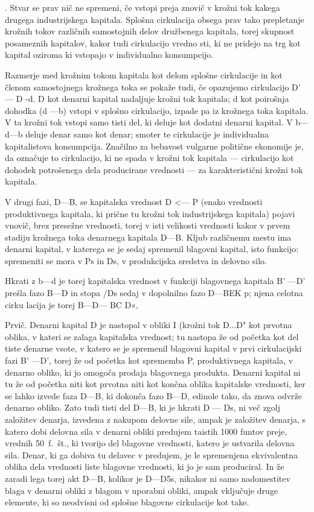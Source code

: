 \documentclass[kapital_02.tex]{subfiles}
\begin{document}
. Stvar se prav nič ne spremeni, če vstopi preja znovič v krožni tok kakega drugega industrijskega kapitala. Splošna cirkulacija obsega prav tako prepletanje krožnih tokov različnih samostojnih delov družbenega kapitala, torej skupnost posameznih kapitalov, kakor tudi cirkulacijo vredno sti, ki ne pridejo na trg kot kapital oziroma ki vstopajo v individualno konsumpcijo.

Razmerje med krožnim tokom kapitala kot delom splošne cirkulacije in kot členom samostojnega krožnega toka se pokaže tudi, če opazujemo cirkulacijo D' — D -d. D kot denarni kapital nadaljuje krožni tok kapitala; d kot poirošnja dohodka (d —b) vstopi v splošno cirkulacijo, izpade pa iz krožnega toka kapitala. V ta krožni tok vstopi samo tisti del, ki deluje kot dodatni denarni kapital. V b—d—b deluje denar samo kot denar; smoter te cirkulacije je individualna kapitalistova konsumpcija. Značilno za bebavost vulgarne politične ekonomije je, da označuje to cirkulacijo, ki ne spada v krožni tok kapitala — cirkulacijo kot dohodek potrošenega dela producirane vrednosti — za karakteristični krožni tok kapitala.

V drugi fazi, D—B, se kapitalska vrednost D <— P (enako vrednosti produktivnega kapitala, ki prične tu krožni tok industrijskega kapitala) pojavi vnovič, brez presežne vrednosti, torej v isti velikosti vrednosti kakor v prvem stadiju krožnega toka denarnega kapitala D—B. Kljub različnemu mestu ima denarni kapital, v katerega se je sedaj spremenil blagovni kapital, isto funkcijo: spremeniti se mora v Ps in Ds, v produkcijska sredstva in delovno silo.

Hkrati z b—d je torej kapitalska vrednost v funkciji blagovnega kapitala B' —D' prešla fazo B—D in stopa /Ds sedaj v dopolnilno fazo D—BEK p; njena celotna cirku lacija je torej B—D— BC D«,

Prvič. Denarni kapital D je nastopal v obliki I (krožni tok D...D" kot prvotna oblika, v kateri se zalaga kapitalska vrednost; tu nastopa že od početka kot del tiste denarne vsote, v katero se je spremenil blagovni kapital v prvi cirkulacijski fazi B' —D', torej že od početka kot sprememba P, produktivnega kapitala, v denarno obliko, ki jo omogoča prodaja blagovnega produkta. Denarni kapital ni tu že od početka niti kot prvotna niti kot končna oblika kapitalske vrednosti, ker se lahko izvede faza D—B, ki dokonča fazo B—D, edinole tako, da znova odvrže denarno obliko. Zato tudi tisti del D—B, ki je hkrati D — Ds, ni več zgolj založitev denarja, izvedena z nakupom delovne sile, ampak je založitev denarja, s katero dobi delovna sila v denarni obliki predujem taistih 1000 funtov preje, vrednih 50~f.~št., ki tvorijo del blagovne vrednosti, katero je ustvarila delovna sila. Denar, ki ga dobiva tu delavec v predujem, je le spremenjena ekvivalentna oblika dela vrednosti liste blagovne vrednosti, ki jo je sam produciral. In že zaradi lega torej akt D—B, kolikor je D—D5s, nikakor ni samo nadomestitev blaga v denarni obliki z blagom v uporabni obliki, ampak vključuje druge elemente, ki so neodvisni od splošne blagovne cirkulacije kot take.
\end{document}
